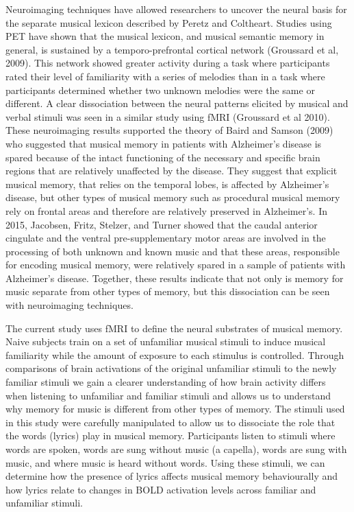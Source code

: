 \documentclass[12pt,letterpaper]{report}
\begin{document}
Neuroimaging techniques have allowed researchers to uncover the neural basis for the separate musical lexicon described by Peretz and Coltheart. Studies using PET have shown that the musical lexicon, and musical semantic memory in general, is sustained by a temporo-prefrontal cortical network (Groussard et al, 2009). This network showed greater activity during a task where participants rated their level of familiarity with a series of melodies than in a task where participants determined whether two unknown melodies were the same or different. 
A clear dissociation between the neural patterns elicited by musical and verbal stimuli was seen in a similar study using fMRI (Groussard et al 2010). 
These neuroimaging results supported the theory of Baird and Samson (2009) who suggested that musical memory in patients with Alzheimer's disease is spared because of the intact functioning of the necessary and specific brain regions that are relatively unaffected by the disease. They suggest that explicit musical memory, that relies on the temporal lobes, is affected by Alzheimer's disease, but other types of musical memory such as procedural musical memory rely on frontal areas and therefore are relatively preserved in Alzheimer's. In 2015, Jacobsen, Fritz, Stelzer, and Turner showed that the caudal anterior cingulate and the ventral pre-supplementary motor areas are involved in the processing of both unknown and known music and that these areas, responsible for encoding musical memory, were relatively spared in a sample of patients with Alzheimer's disease. Together, these results indicate that not only is memory for music separate from other types of memory, but this dissociation can be seen with neuroimaging techniques. 

The current study uses fMRI to define the neural substrates of musical memory. 
Naive subjects train on a set of unfamiliar musical stimuli to induce musical familiarity while the amount of exposure to each stimulus is controlled.
Through comparisons of brain activations of the original unfamiliar stimuli to the newly familiar stimuli we gain a clearer understanding of how brain activity differs when listening to unfamiliar and familiar stimuli and allows us to understand why memory for music is different from other types of memory. 
The stimuli used in this study were carefully manipulated to allow us to dissociate the role that the words (lyrics) play in musical memory. 
Participants listen to stimuli where words are spoken, words are sung without music (a capella), words are sung with music, and where music is heard without words. 
Using these stimuli, we can determine how the presence of lyrics affects musical memory behaviourally and how lyrics relate to changes in BOLD activation levels across familiar and unfamiliar stimuli. 
\end{document}
